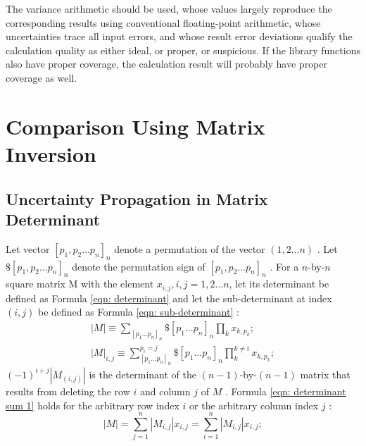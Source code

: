 \documentclass[twoside]{article}
\numberwithin{equation}{section}
\begin{document}
The variance arithmetic should be used, whose values largely reproduce the corresponding results using conventional floating-point arithmetic, whose uncertainties trace all input errors, and whose result error deviations qualify the calculation quality as either ideal, or proper, or suspicious.
If the library functions also have proper coverage, the calculation result will probably have proper coverage as well.








\clearpage
\section{Comparison Using Matrix Inversion}
\label{sec: matrix}


\subsection{Uncertainty Propagation in Matrix Determinant}

Let vector $[p_{1}, p_{2} \dots p_{n}]_{n}$ denote a permutation of the vector $(1,2\dots n)$ \cite{Linear_Algebra}.  Let $\$[p_{1}, p_{2} \dots p_{n}]_{n}$ denote the permutation sign of $[p_{1}, p_{2} \dots p_{n}]_{n}$ \cite{Linear_Algebra}.  For a $n$-by-$n$ square matrix M with the element $x_{i,j}, i,j=1,2\dots n$, let its determinant be defined as Formula \eqref{eqn: determinant} \cite{Numerical_Recipes} and let the sub-determinant at index $(i, j)$ be defined as Formula \eqref{eqn: sub-determinant} \cite{Linear_Algebra}:
\begin{align}
\label{eqn: determinant}
|M| \equiv 
\sum_{[p_{1}\dots p_{n}]_{n}} \$ [p_{1}\dots p_{n}]_{n} 
    \prod _{k} x_{k,p_{k}}; \\
\label{eqn: sub-determinant}
|M|_{i,j} \equiv 
\sum_{[p_{1}\dots p_{n}]_{n}}^{p_{i} = j} \$ [p_{1}\dots p_{n}]_{n} 
    \prod _{k}^{k \ne i} x_{k,p_{k}};
\end{align}
$(-1)^{i+j} |M_{(i,j)}|$ is the determinant of the $(n-1)$-by-$(n-1)$ matrix that results from deleting the row $i$ and column $j$ of $M$ \cite{Numerical_Recipes}.  Formula \eqref{eqn: determinant sum 1} holds for the arbitrary row index $i$ or the arbitrary column index $j$ \cite{Numerical_Recipes}:
\begin{equation}
\label{eqn: determinant sum 1}
|M| =\sum_{j=1}^{n} |M_{i,j}| x_{i,j} = \sum_{i=1}^{n} |M_{i,j}| x_{i,j};
\end{equation}
\end{document}
